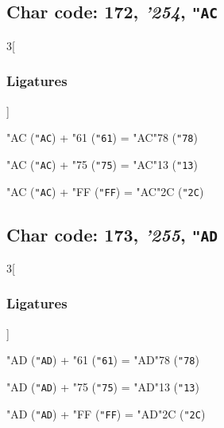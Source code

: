 \documentclass{article}
\newlength{\maxcharwidth}
\begin{document}
\subsection{Char code: 172, {\it'254}, {\tt"AC}}
\label{char_172}


\begin{multicols}{3}[\subsubsection{Ligatures}]

{\testfont\char"AC\noboundary} ({\tt"AC}) + {\testfont\char"61\noboundary} ({\tt"61}) = {\testfont\char"AC\noboundary}{\testfont\char"78\noboundary} ({\tt"78}) 

{\testfont\char"AC\noboundary} ({\tt"AC}) + {\testfont\char"75\noboundary} ({\tt"75}) = {\testfont\char"AC\noboundary}{\testfont\char"13\noboundary} ({\tt"13}) 

{\testfont\char"AC\noboundary} ({\tt"AC}) + {\testfont\char"FF\noboundary} ({\tt"FF}) = {\testfont\char"AC\noboundary}{\testfont\char"2C\noboundary} ({\tt"2C}) 

\end{multicols}

\subsection{Char code: 173, {\it'255}, {\tt"AD}}
\label{char_173}


\begin{multicols}{3}[\subsubsection{Ligatures}]

{\testfont\char"AD\noboundary} ({\tt"AD}) + {\testfont\char"61\noboundary} ({\tt"61}) = {\testfont\char"AD\noboundary}{\testfont\char"78\noboundary} ({\tt"78}) 

{\testfont\char"AD\noboundary} ({\tt"AD}) + {\testfont\char"75\noboundary} ({\tt"75}) = {\testfont\char"AD\noboundary}{\testfont\char"13\noboundary} ({\tt"13}) 

{\testfont\char"AD\noboundary} ({\tt"AD}) + {\testfont\char"FF\noboundary} ({\tt"FF}) = {\testfont\char"AD\noboundary}{\testfont\char"2C\noboundary} ({\tt"2C}) 

\end{multicols}
\end{document}
